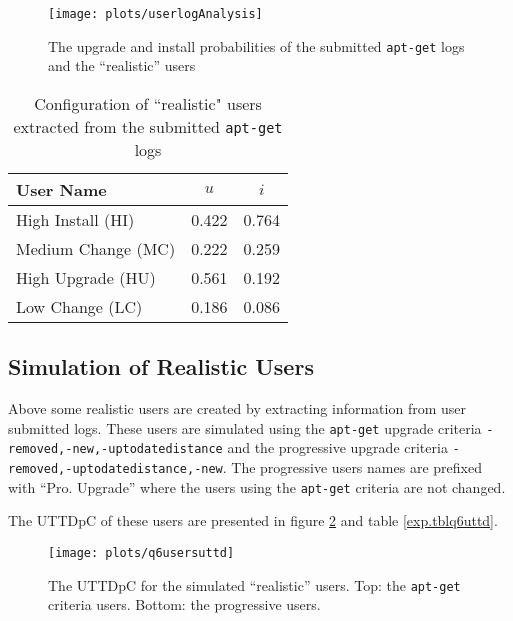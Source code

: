 \begin{figure}[htp]
\begin{center}
  \texttt{[image: plots/userlogAnalysis]}
  \caption{The upgrade and install probabilities of the submitted \texttt{apt-get} logs and the ``realistic'' users}
  \label{exp.figuserlogs}
\end{center}
\end{figure}

\begin{table}[h!]
\centering
\begin{tabular}{|l | c | c | }
\hline
User Name 				& 	$u$ 		& $i$ 		\\ \hline
High Install (HI)			& 0.422			& 0.764 	\\
Medium Change (MC)			& 0.222			& 0.259 	\\
High Upgrade (HU)			& 0.561			& 0.192		\\
Low Change 	(LC)			& 0.186			& 0.086 	\\ \hline
\end{tabular}
\caption{Configuration of ``realistic" users extracted from the submitted \texttt{apt-get} logs}
\label{exp.tbluserlogs}
\end{table}

\subsection{Simulation of Realistic Users}
\label{exp.q4}
Above some realistic users are created by extracting information from user submitted logs.
These users are simulated using the \texttt{apt-get} upgrade criteria \texttt{-removed,-new,-uptodatedistance} and the progressive upgrade criteria \texttt{-removed,-uptodatedistance,-new}.
The progressive users names are prefixed  with ``Pro. Upgrade'' where the users using the \texttt{apt-get} criteria are not changed.

The UTTDpC of these users are presented in figure \ref{exp.q6uttdpc} and table \ref{exp.tblq6uttd}.
\begin{figure}[htp]
\begin{center}
  \texttt{[image: plots/q6usersuttd]}
  \caption{The UTTDpC for the simulated ``realistic'' users. Top: the \texttt{apt-get} criteria users. Bottom: the progressive users.}
  \label{exp.q6uttdpc}
\end{center}
\end{figure}

